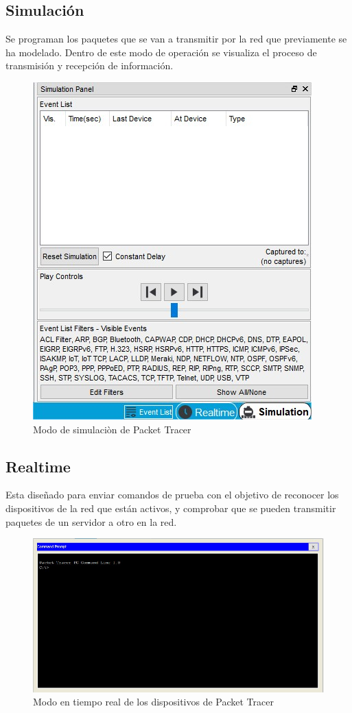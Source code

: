 \documentclass[journal]{IEEEtran}
\begin{document}
\subsection{Simulación}
Se programan los paquetes que se van a transmitir por la red que previamente se ha modelado. Dentro de este modo de operación se visualiza el proceso de transmisión y recepción de información.
\begin{figure}[ht]
	\centering
	\includegraphics[scale=0.3]{pt_simulation.jpg}
	\caption{Modo de simulaciòn de Packet Tracer}
\end{figure}

\newpage

\subsection{Realtime}
Esta diseñado para enviar comandos de prueba con el objetivo de reconocer los dispositivos de la red que están activos, y comprobar que se pueden transmitir paquetes de un servidor a otro en la red. 

\begin{figure}[ht]
	\centering
	\includegraphics[scale=0.3]{pt_realtime.jpg}
	\caption{Modo en tiempo real de los dispositivos de Packet Tracer}
\end{figure}
\end{document}
